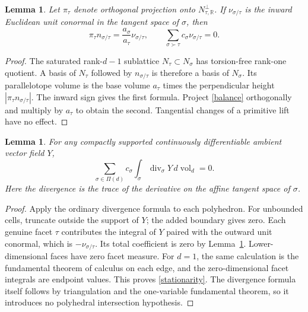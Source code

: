 \documentclass[11pt]{article}
\newtheorem{lemma}[theorem]{Lemma}
\newcommand{\R}{\mathbb R}
\newcommand{\vol}{\operatorname{vol}}
\begin{document}
\begin{lemma}\label{height}
Let $\pi_\tau$ denote orthogonal projection onto $N_{\tau,\R}^{\perp}$. If $\nu_{\sigma/\tau}$ is the inward Euclidean unit conormal in the tangent space of $\sigma$, then
\[
 \pi_\tau n_{\sigma/\tau}
   =\frac{a_\sigma}{a_\tau}\nu_{\sigma/\tau},
 \qquad
 \sum_{\sigma\succ\tau}c_\sigma\nu_{\sigma/\tau}=0.
\]
\end{lemma}
\begin{proof}
The saturated rank-$d-1$ sublattice $N_\tau\subset N_\sigma$ has torsion-free rank-one quotient. A basis of $N_\tau$ followed by $n_{\sigma/\tau}$ is therefore a basis of $N_\sigma$. Its parallelotope volume is the base volume $a_\tau$ times the perpendicular height $|\pi_\tau n_{\sigma/\tau}|$. The inward sign gives the first formula. Project \eqref{balance} orthogonally and multiply by $a_\tau$ to obtain the second. Tangential changes of a primitive lift have no effect.
\end{proof}

\begin{lemma}\label{stationary}
For any compactly supported continuously differentiable ambient vector field $Y$,
\begin{equation}\label{stationarity}
 \sum_{\sigma\in\Pi(d)}c_\sigma
       \int_\sigma\operatorname{div}_{\sigma}Y\,d\vol_d=0.
\end{equation}
Here the divergence is the trace of the derivative on the affine tangent space of $\sigma$.
\end{lemma}
\begin{proof}
Apply the ordinary divergence formula to each polyhedron. For unbounded cells, truncate outside the support of $Y$; the added boundary gives zero. Each genuine facet $\tau$ contributes the integral of $Y$ paired with the outward unit conormal, which is $-\nu_{\sigma/\tau}$. Its total coefficient is zero by Lemma~\ref{height}. Lower-dimensional faces have zero facet measure. For $d=1$, the same calculation is the fundamental theorem of calculus on each edge, and the zero-dimensional facet integrals are endpoint values. This proves \eqref{stationarity}. The divergence formula itself follows by triangulation and the one-variable fundamental theorem, so it introduces no polyhedral intersection hypothesis.
\end{proof}
\end{document}

